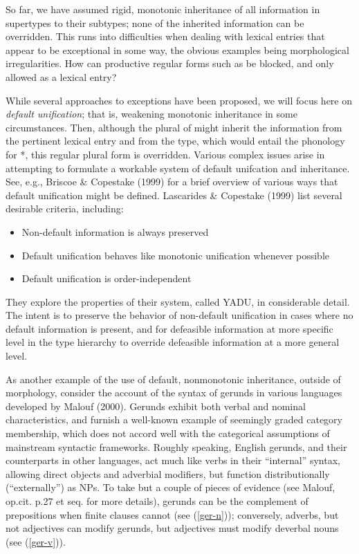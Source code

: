 \documentclass[output=paper]{langsci/langscibook}
\begin{document}
So far, we have assumed rigid, monotonic inheritance of all information in supertypes to their subtypes; none of the inherited information can be overridden.
This runs into difficulties when dealing with lexical entries that appear to be exceptional in some way, the obvious examples being morphological irregularities.
How can productive regular forms such as  be blocked, and only  allowed as a lexical entry?

While several approaches to exceptions have been proposed, we will focus here on \emph{default unification}; that is, weakening monotonic inheritance in some circumstances.
Then, although the plural of  might inherit the information from the pertinent lexical entry and from the  type, which would entail the phonology for *, this regular plural form is overridden.
Various complex issues arise in attempting to formulate a workable system of default unifcation and inheritance.
See, e.g., Briscoe \& Copestake (1999) for a brief overview of various ways that default unification might be defined.
Lascarides \& Copestake (1999) list several desirable criteria, including:

\begin{itemize}
	\item Non-default information is always preserved
	\item Default unification behaves like monotonic unification whenever possible
	\item Default unification is order-independent
\end{itemize}

They explore the properties of their system, called YADU, in considerable detail.
The intent is to preserve the behavior of non-default unification in cases where no default information is present, and for defeasible information at more specific level in the type hierarchy to override defeasible information at a more general level.

As another example of the use of default, nonmonotonic inheritance, outside of morphology, consider the account of the syntax of gerunds in various languages developed by Malouf (2000).
Gerunds exhibit both verbal and nominal characteristics, and furnish a well-known example of seemingly graded category membership, which does not accord well with the categorical assumptions of mainstream syntactic frameworks.
Roughly speaking, English gerunds, and their counterparts in other languages, act much like verbs in their ``internal'' syntax, allowing direct objects and adverbial modifiers, but function distributionally (``externally'') as NPs. To take but a couple of pieces of evidence (see Malouf, op.cit. p.27 et seq. for more details), gerunds can be the complement of prepositions when finite clauses cannot (see (\ref{ger-n})); conversely, adverbs, but not adjectives can modify gerunds, but adjectives must modify deverbal nouns (see (\ref{ger-v})).
\end{document}
